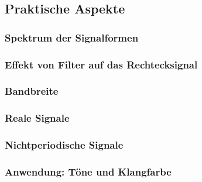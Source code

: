\subsection{Praktische Aspekte}

\subsubsection{Spektrum der Signalformen}

\subsubsection{Effekt von Filter auf das Rechtecksignal}

\subsubsection{Bandbreite}

\subsubsection{Reale Signale}

\subsubsection{Nichtperiodische Signale}

\subsubsection{Anwendung: Töne und Klangfarbe}